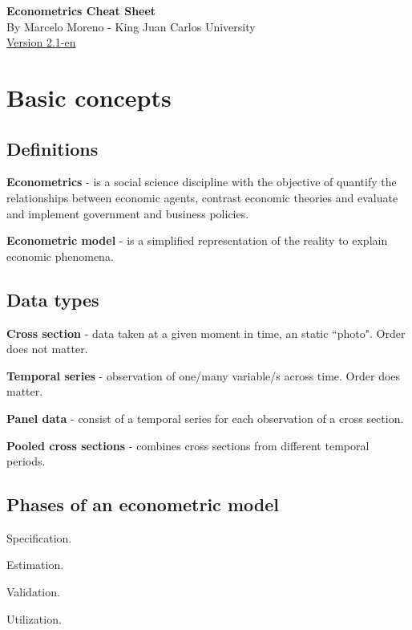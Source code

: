 \documentclass[10pt, a4paper, landscape]{extarticle}
\begin{document}
\begin{multicols}{3} %

\begin{center}
\textbf{\LARGE Econometrics Cheat Sheet} \\ {\footnotesize By Marcelo Moreno - King Juan Carlos University} \\ {\footnotesize \href{https://github.com/marcelomijas/econometrics-cheatsheet}{Version 2.1-en}}
\end{center}

\section*{Basic concepts}
\subsection*{Definitions}

\textbf{Econometrics} - is a social science discipline with the objective of quantify the relationships between economic agents, contrast economic theories and evaluate and implement government and business policies.

\textbf{Econometric model} - is a simplified representation of the reality to explain economic phenomena.

\subsection*{Data types}

\textbf{Cross section} - data taken at a given moment in time, an static ``photo". Order does not matter.

\textbf{Temporal series} - observation of one/many variable/s across time. Order does matter.

\textbf{Panel data} - consist of a temporal series for each observation of a cross section.

\textbf{Pooled cross sections} - combines cross sections from different temporal periods.

\subsection*{Phases of an econometric model}

\begin{enumerate}[leftmargin=*]
\setlength{\multicolsep}{0pt}
\begin{multicols}{2}
\item Specification.
\item Estimation.
\columnbreak
\item Validation.
\item Utilization.
\end{multicols}
\end{enumerate}


\end{multicols}
\end{document}
